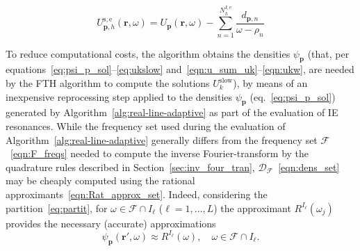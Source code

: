 \documentclass[11pt]{article}
\theoremstyle{plain}
\theoremstyle{remark}
\def \br{\mathbf{r}}
\def \bp{\mathbf{p}}
\begin{document}
\begin{equation}\label{eq:usie}
U_{\bp,h}^\mathrm{s,e}(\br,\omega) = U_{\bp}(\br,\omega) - \sum_{n=1}^{N^{I,\mathrm{e}}_h} \frac{d_{\bp,n}}{\omega - \rho_n}
  \end{equation}

To reduce computational costs, the algorithm obtains the densities
$\psi_\bp$ (that, per equations~\eqref{eq:psi_p_sol}–\eqref{eq:ukslow}
and~\eqref{eqn:u_sum_uk}–\eqref{eqn:ukw}, are needed by the FTH
algorithm to compute the solutions $U_k^{\mathrm{slow}}$), by means of
an inexpensive reprocessing step applied to the densities $\psi_\bp$
(eq.~\eqref{eq:psi_p_sol}) generated by
Algorithm~\ref{alg:real-line-adaptive} as part of the evaluation of IE
resonances. While the frequency set used during the evaluation of 
Algorithm~\ref{alg:real-line-adaptive} generally
differs from the frequency set $\mathcal{F}$~\eqref{eqn:F_freqs}
needed to compute the inverse Fourier-transform by the quadrature
rules described in Section~\ref{sec:inv_four_tran},
$\mathcal{D}_\mathcal{F}$~\eqref{eqn:dens_set} may be cheaply computed
using the rational approximants~\eqref{eqn:Rat_approx_set}. Indeed,
considering the partition~\eqref{eq:partit}, for
$\omega \in \mathcal{F}\cap I_\ell$ ($\ell = 1,\dots,L$) the
approximant $R^{I_\ell}(\omega_j)$ provides the necessary (accurate)
approximations
\begin{equation}\label{psi-R-reuse}
\psi_\bp(\br',\omega) \approx R^{I_\ell}(\omega),\quad \omega \in \mathcal{F}\cap I_\ell.
\end{equation}

\end{document}
